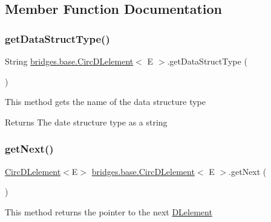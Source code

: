 \subsection{Member Function Documentation}
\mbox{\label{classbridges_1_1base_1_1_circ_d_lelement_ab4885ae7517f1dd04874270c1c3eaf44}} 
\subsubsection{\texorpdfstring{get\+Data\+Struct\+Type()}{getDataStructType()}}
{\footnotesize\ttfamily String \mbox{\hyperlink{classbridges_1_1base_1_1_circ_d_lelement}{bridges.\+base.\+Circ\+D\+Lelement}}$<$ E $>$.get\+Data\+Struct\+Type (\begin{DoxyParamCaption}{ }\end{DoxyParamCaption})}

This method gets the name of the data structure type

\begin{DoxyReturn}{Returns}
The date structure type as a string 
\end{DoxyReturn}
\mbox{\label{classbridges_1_1base_1_1_circ_d_lelement_a9ace56dde1f4c23e9a8798c045100ee6}} 
\subsubsection{\texorpdfstring{get\+Next()}{getNext()}}
{\footnotesize\ttfamily \mbox{\hyperlink{classbridges_1_1base_1_1_circ_d_lelement}{Circ\+D\+Lelement}}$<$E$>$ \mbox{\hyperlink{classbridges_1_1base_1_1_circ_d_lelement}{bridges.\+base.\+Circ\+D\+Lelement}}$<$ E $>$.get\+Next (\begin{DoxyParamCaption}{ }\end{DoxyParamCaption})}

This method returns the pointer to the next \mbox{\hyperlink{classbridges_1_1base_1_1_d_lelement}{D\+Lelement}}

